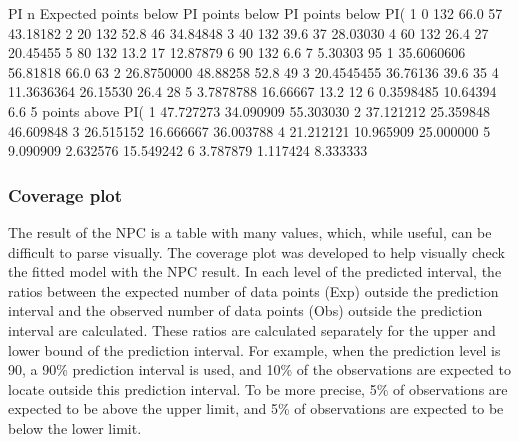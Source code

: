 \begin{Schunk}
\begin{Soutput}
  PI   n Expected points below PI points below PI points below PI(%
1  0 132                     66.0              57           43.18182
2 20 132                     52.8              46           34.84848
3 40 132                     39.6              37           28.03030
4 60 132                     26.4              27           20.45455
5 80 132                     13.2              17           12.87879
6 90 132                      6.6               7            5.30303
  95%
1        35.6060606        56.81818                     66.0              63
2        26.8750000        48.88258                     52.8              49
3        20.4545455        36.76136                     39.6              35
4        11.3636364        26.15530                     26.4              28
5         3.7878788        16.66667                     13.2              12
6         0.3598485        10.64394                      6.6               5
  points above PI(%
1          47.727273         34.090909       55.303030
2          37.121212         25.359848       46.609848
3          26.515152         16.666667       36.003788
4          21.212121         10.965909       25.000000
5           9.090909          2.632576       15.549242
6           3.787879          1.117424        8.333333
\end{Soutput}
\end{Schunk}

\hypertarget{coverage}{%
\subsubsection{Coverage plot}\label{coverage}}

 The result of the NPC is a table with many values, which, while useful, can be difficult to parse visually. The coverage plot \citep{karlsson2008tutorial} was developed to help visually check the fitted model with the NPC result.
In each level of the predicted interval, the ratios between the expected number of data points (Exp) outside the prediction interval and the observed number of data  points (Obs)
outside the prediction interval are calculated. These ratios are calculated separately for the upper and lower bound of the prediction interval. For example, when the prediction level is 90, a 90\% prediction interval is used, and 10\% of the observations are expected to locate outside this prediction interval. To be more precise, 5\% of observations are expected to be above the upper limit, and 5\% of observations are expected to be below the lower limit.

